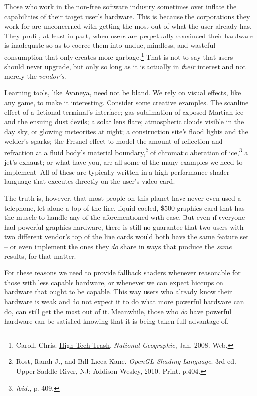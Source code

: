 Those who work in the non-free software industry sometimes over inflate the capabilities of their target user's hardware. This is because the corporations they work for are unconcerned with getting the most out of what the user already has. They profit, at least in part, when users are perpetually convinced their hardware is inadequate so as to coerce them into undue, mindless, and wasteful consumption that only creates more garbage.\footnote{Caroll, Chris. \href{http://ngm.nationalgeographic.com/2008/01/high-tech-trash/carroll-text}{High-Tech Trash}. {\it National Geographic}, Jan. 2008. Web.} That is not to say that users should never upgrade, but only so long as it is actually in {\it their} interest and not merely the {\it vendor's}.

Learning tools, like Avaneya, need not be bland. We rely on visual effects, like any game, to make it interesting. Consider some creative examples. The scanline effect of a fictional terminal's interface; gas sublimation of exposed Martian ice and the ensuing dust devils; a solar lens flare; atmospheric  clouds visible in the day sky, or glowing meteorites at night; a construction site's flood lights and the welder's sparks; the Fresnel effect to model the amount of reflection and refraction at a fluid body's material boundary,\footnote{Rost, Randi J., and Bill Licea-Kane. {\it OpenGL Shading Language}. 3rd ed. Upper Saddle River, NJ: Addison Wesley, 2010. Print. p.404.} of chromatic aberation of ice,\footnote{{\it ibid.}, p. 409.} a jet's exhaust; or what have you, are all some of the many examples we need to implement. All of these are typically written in a high performance shader language that executes directly on the user's video card.

The truth is, however, that most people on this planet have never even used a telephone, let alone a top of the line, liquid cooled, \$500 graphics card that has the muscle to handle any of the aforementioned with ease. But even if everyone had powerful graphics hardware, there is still no guarantee that two users with two different vendor's top of the line cards would both have the same feature set -- or even implement the ones they {\it do} share in ways that produce the {\it same} results, for that matter. 

For these reasons we need to provide fallback shaders whenever reasonable for those with less capable hardware, or whenever we can expect hiccups on hardware that ought to be capable. This way users who already know their hardware is weak and do not expect it to do what more powerful hardware can do, can still get the most out of it. Meanwhile, those who {\it do} have powerful hardware can be satisfied knowing that it is being taken full advantage of.

